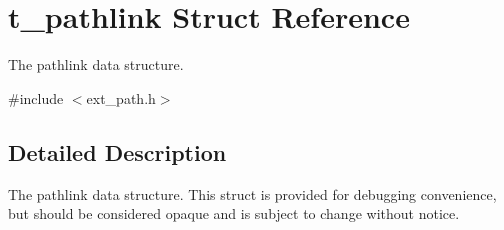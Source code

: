 \hypertarget{structt__pathlink}{
\section{t\_\-pathlink Struct Reference}
\label{structt__pathlink}
}


The pathlink data structure.  


{\ttfamily \#include $<$ext\_\-path.h$>$}

\subsection{Detailed Description}
The pathlink data structure. This struct is provided for debugging convenience, but should be considered opaque and is subject to change without notice. 